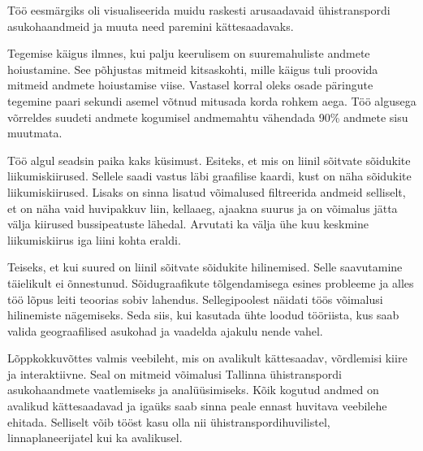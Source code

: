 Töö eesmärgiks oli visualiseerida muidu raskesti arusaadavaid ühistranspordi  asukohaandmeid ja muuta need paremini kättesaadavaks.

Tegemise käigus ilmnes, kui palju keerulisem on suuremahuliste andmete hoiustamine. See põhjustas mitmeid kitsaskohti, mille käigus tuli proovida mitmeid andmete hoiustamise viise. Vastasel korral oleks osade päringute tegemine paari sekundi asemel võtnud mitusada korda rohkem aega. Töö algusega võrreldes suudeti andmete kogumisel andmemahtu vähendada 90\% andmete sisu muutmata.

Töö algul seadsin paika kaks küsimust. Esiteks, et mis on liinil sõitvate sõidukite liikumiskiirused. 
Sellele saadi vastus läbi graafilise kaardi, kust on näha sõidukite liikumiskiirused. Lisaks on sinna lisatud võimalused filtreerida andmeid selliselt, et on näha vaid huvipakkuv liin, kellaaeg, ajaakna suurus ja on võimalus jätta välja kiirused bussipeatuste lähedal. Arvutati ka välja ühe kuu keskmine liikumiskiirus iga liini kohta eraldi.

Teiseks, et kui suured on liinil sõitvate sõidukite hilinemised.
Selle saavutamine täielikult ei õnnestunud. Sõidugraafikute tõlgendamisega esines probleeme ja alles töö lõpus leiti teoorias sobiv lahendus. Sellegipoolest näidati töös võimalusi hilinemiste nägemiseks. Seda siis, kui kasutada ühte loodud tööriista, kus saab valida geograafilised asukohad ja vaadelda ajakulu nende vahel.

Lõppkokkuvõttes valmis veebileht, mis on avalikult kättesaadav, võrdlemisi kiire ja interaktiivne. Seal on mitmeid võimalusi Tallinna ühistranspordi asukohaandmete vaatlemiseks ja analüüsimiseks. Kõik kogutud andmed on avalikud kättesaadavad ja igaüks saab sinna peale ennast huvitava veebilehe ehitada. Selliselt võib tööst kasu olla nii ühistranspordihuvilistel, linnaplaneerijatel kui ka avalikusel.




